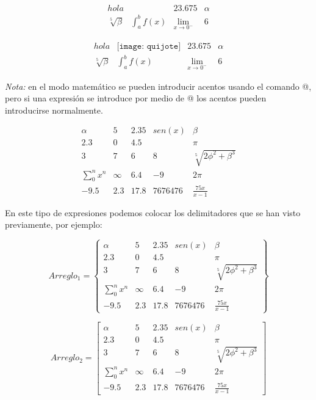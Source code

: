\documentclass[letterpaper,12pt]{book}
\begin{document}
\[
\begin{array}{lclr}
	 hola & & 23.675& \alpha \\
	\sqrt[5]{\beta} & \int_{a}^{b} f(x) & \lim_{x \to 0^{-}} & 6
\end{array}
\]

\[
\begin{array}{lclr}
	 hola & \texttt{[image: quijote]} & 23.675& \alpha \\
	\sqrt[5]{\beta} & \int_{a}^{b} f(x) & \lim_{x \to 0^{-}} & 6
\end{array}
\]

\emph{Nota:} en el modo matemático se pueden introducir acentos usando el comando \verb@\acute{}@, pero si una
expresión se introduce por medio de \verb@\mbox{}@ los acentos pueden introducirse normalmente.

\[
\begin{array}{ccccc}
	\alpha & 5 & 2.35 & sen(x) & \beta \\
	2.3 & 0 & 4.5 & & \pi \\
	3 & 7 & 6 & 8 & \sqrt[5]{2 \phi^2 + \beta^3} \\
	\displaystyle\sum_{0}^{n} x^n & \infty & 6.4 & -9 & 2 \pi \\
	-9.5 & 2.3 & 17.8 & 7676476 & \frac{75 x}{x-1}
\end{array}
\]

En este tipo de expresiones podemos colocar los delimitadores que se han visto previamente, por ejemplo:

\[
Arreglo_1 = \left\{\begin{array}{ccccc}
	\alpha & 5 & 2.35 & sen(x) & \beta \\
	2.3 & 0 & 4.5 & & \pi \\
	3 & 7 & 6 & 8 & \sqrt[5]{2 \phi^2 + \beta^3} \\
	\displaystyle\sum_{0}^{n} x^n & \infty & 6.4 & -9 & 2 \pi \\
	-9.5 & 2.3 & 17.8 & 7676476 & \frac{75 x}{x-1}
\end{array}
\right\}
\]

\[
Arreglo_2 = \left[ \begin{array}{ccccc}
	\alpha & 5 & 2.35 & sen(x) & \beta \\
	2.3 & 0 & 4.5 & & \pi \\
	3 & 7 & 6 & 8 & \sqrt[5]{2 \phi^2 + \beta^3} \\
	\displaystyle\sum_{0}^{n} x^n & \infty & 6.4 & -9 & 2 \pi \\
	-9.5 & 2.3 & 17.8 & 7676476 & \frac{75 x}{x-1}
\end{array}
\right]
\]
\end{document}
